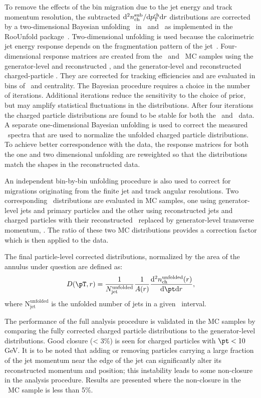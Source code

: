 To remove the effects of the bin migration due to the jet energy and track momentum resolution, the subtracted $\mathrm{d}^2 \mbox{$n_{\mathrm{ch}}^{\mathrm{sub}}$} /\mathrm{d}\mbox{$p_{\mathrm{T}}^{\mathrm{ch}}$} \mathrm{d} r$ distributions are corrected by a two-dimensional Bayesian unfolding~\cite{DAgostini:1994zf}
in \pttrk\ and \ptjet\ as implemented in the RooUnfold package~\cite{Adye:2011gm}.  
Two-dimensional unfolding is used because the calorimetric jet energy response depends on the fragmentation pattern of the jet~\cite{Aad:2011he}.
Four-dimensional response matrices are created from the \pp\ and \pbpb\ MC samples using the generator-level and reconstructed \ptjet, and the generator-level and reconstructed charged-particle \pttrk. They are corrected for tracking efficiencies and are evaluated in bins of \rvar\ and centrality. The Bayesian procedure requires a choice in the number of iterations.
Additional iterations reduce the sensitivity to the choice of prior, but may
amplify statistical fluctuations in the distributions.
After four iterations the 
charged particle distributions are found to be stable for both the \PbPb\ and \pp\ data.
A separate one-dimensional Bayesian unfolding is used to correct the measured \ptjet\ spectra that are used to normalize the unfolded charged particle distributions.
To achieve better correspondence with the data, the response matrices for both the one and two dimensional unfolding are reweighted so that the distributions match the shapes in the reconstructed data.

An independent bin-by-bin unfolding procedure is also used to correct for migrations originating from the finite jet and track angular resolutions. Two corresponding \Dptr\ distributions are evaluated in MC samples, one using generator-level jets and primary particles and the other using reconstructed jets and charged particles with their reconstructed \pt\ replaced by generator-level transverse momentum, \pTtrue. The ratio of these two MC distributions provides a correction factor which is then applied to the data. 

The final particle-level corrected distributions, normalized by the area of the annulus under question are defined as:
\begin{eqnarray}
 \label{eq:Dpt}
   \Dptr = \frac{1}{N_\mathrm{jet}^\mathrm{unfolded}} \frac{1}{A(r)} \frac{\fd^2 \nchunf(r)}{\fd \pt \fd r},
 \end{eqnarray}
where $\text{N}_{\text{jet}}^{\text{unfolded}}$ is the unfolded number of jets in a given \ptjet\ interval.

The performance of the full analysis procedure is validated in the MC samples by comparing the fully corrected charged particle distributions to the generator-level distributions. Good closure (< 3\%) is seen for charged particles with $\pt < 10$ GeV.
It is to be noted that adding or removing particles carrying a large fraction of the jet momentum near the edge of the jet can significantly alter its
reconstructed momentum and position; this instability leads to some non-closure in the analysis procedure.
Results are presented where the non-closure in the \pp\ MC sample is less than 5\%.

